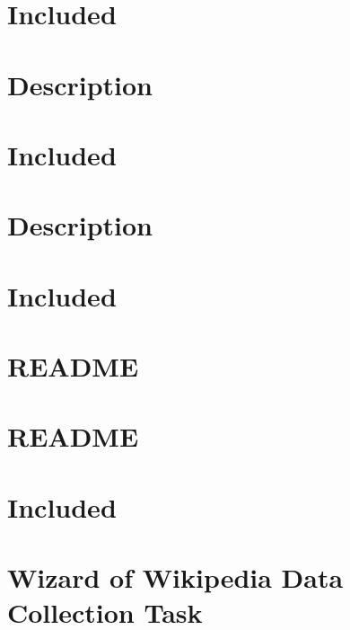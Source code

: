 \documentclass[twoside]{book}
\newcommand{\+}{\discretionary{\mbox{\scriptsize$\hookleftarrow$}}{}{}}
\begin{document}
\chapter{Included}
\label{md_parlai_mturk_core_dev_README}

\chapter{Description}
\label{md_parlai_mturk_core_legacy_2018_react_server_README}

\chapter{Included}
\label{md_parlai_mturk_core_legacy_2018_README}

\chapter{Description}
\label{md_parlai_mturk_core_react_server_README}

\chapter{Included}
\label{md_parlai_mturk_core_README}

\chapter{R\+E\+A\+D\+ME}
\label{md_parlai_mturk_README}

\chapter{R\+E\+A\+D\+ME}
\label{md_parlai_mturk_tasks_personachat_README}

\chapter{Included}
\label{md_parlai_mturk_tasks_README}

\chapter{Wizard of Wikipedia Data Collection Task}
\label{md_parlai_mturk_tasks_wizard_of_wikipedia_README}

\end{document}
